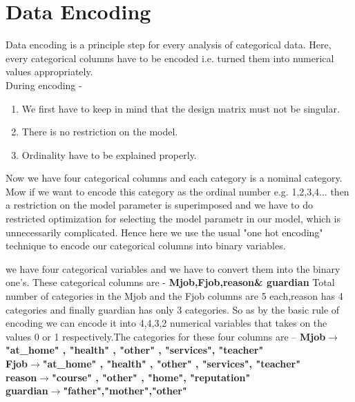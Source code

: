 \documentclass[A4paper,11pt]{report}
\begin{document}
	\section{Data Encoding}
		Data encoding is a principle step for every analysis of categorical data. Here, every categorical columns have to be encoded i.e. turned them into numerical values appropriately. \\During encoding -
		\begin{enumerate}
			\vspace{0 cm} \item We first have to keep in mind that the design matrix must not be singular.
			\vspace{0cm} \item There is no restriction on the model.
			\vspace{0 cm} \item Ordinality have to be explained properly.
		\end{enumerate}
		\par Now we have four categorical columns and each category is a nominal category. Mow if we want to encode this category as the ordinal number e.g. 1,2,3,4... then a restriction on the model parameter is superimposed and we have to do restricted optimization for selecting the model parametr in our model, which is unnecessarily complicated. Hence here we use the usual "one hot encoding" technique to encode our categorical columns into binary variables.\\
		\par we have four categorical variables and we have to convert them into the binary one's. These categorical columns are -
		\textbf{Mjob,Fjob,reason\& guardian}
	 	Total number of categories in the Mjob and the Fjob columns are 5 each,reason has 4 categories and finally guardian has only 3 categories.
			So as by the basic rule of encoding we can encode it into 4,4,3,2 numerical variables that takes on the values 0 or 1 respectively.The categories for these four columns are -- 
			\textbf{Mjob}$\rightarrow$\textbf{"at\_home" , "health" ,  "other"  ,  "services", "teacher" }\\
			\textbf{Fjob}$\rightarrow$\textbf{"at\_home" , "health" ,  "other"  ,  "services", "teacher" }\\
			\textbf{reason}$\rightarrow$\textbf{"course"   ,  "other"   ,   "home",       "reputation"}\\
			\textbf{guardian}$\rightarrow$\textbf{"father","mother","other"}
\end{document}
